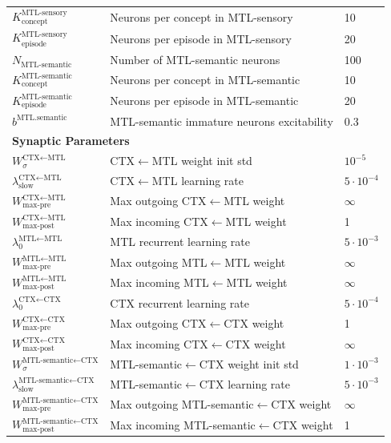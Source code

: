 \documentclass{article}
\begin{document}
\begin{table}[ht]
\begin{tabular}{lp{6cm}l}
$K^\textrm{MTL-sensory}_\textrm{concept}$ & Neurons per concept in MTL-sensory & 10 \\
$K^\textrm{MTL-sensory}_\textrm{episode}$ & Neurons per episode in MTL-sensory & 20 \\
$N_{\text{MTL-semantic}}$ & Number of MTL-semantic neurons & 100 \\
$K^\textrm{MTL-semantic}_\textrm{concept}$ & Neurons per concept in MTL-semantic & 10 \\
$K^\textrm{MTL-semantic}_\textrm{episode}$ & Neurons per episode in MTL-semantic & 20 \\
$b^\text{MTL.semantic}$ & MTL-semantic immature neurons excitability & 0.3 \\
\midrule
\multicolumn{3}{l}{\textbf{Synaptic Parameters}} \\
\midrule
$W_\sigma^{\text{CTX}\leftarrow\text{MTL}}$ & CTX$\leftarrow$MTL weight init std &$10^{-5}$ \\
$\lambda^{\text{CTX}\leftarrow\text{MTL}}_{\textrm{slow}}$ & CTX$\leftarrow$MTL learning rate & $5\cdot 10^{-4}$ \\
$W^{\text{CTX}\leftarrow\text{MTL}}_{\text{max-pre}}$ & Max outgoing CTX$\leftarrow$MTL weight & $\infty$ \\
$W^{\text{CTX}\leftarrow\text{MTL}}_{\text{max-post}}$ & Max incoming CTX$\leftarrow$MTL weight & 1 \\
$\lambda^{\text{MTL}\leftarrow\text{MTL}}_0$ & MTL recurrent learning rate & $5\cdot 10^{-3}$ \\
$W^{\text{MTL}\leftarrow\text{MTL}}_{\text{max-pre}}$ & Max outgoing MTL$\leftarrow$MTL weight & $\infty$ \\
$W^{\text{MTL}\leftarrow\text{MTL}}_{\text{max-post}}$ & Max incoming MTL$\leftarrow$MTL weight & $\infty$ \\
$\lambda^{\text{CTX}\leftarrow\text{CTX}}_0$ & CTX recurrent learning rate & $5\cdot 10^{-4}$ \\
$W^{\text{CTX}\leftarrow\text{CTX}}_{\text{max-pre}}$ & Max outgoing CTX$\leftarrow$CTX weight & 1 \\
$W^{\text{CTX}\leftarrow\text{CTX}}_{\text{max-post}}$ & Max incoming CTX$\leftarrow$CTX weight & $\infty$ \\
$W_\sigma^{\text{MTL-semantic}\leftarrow\text{CTX}}$ & MTL-semantic$\leftarrow$CTX weight init std & $1\cdot 10^{-3}$ \\
$\lambda^{\text{MTL-semantic}\leftarrow\text{CTX}}_{\textrm{slow}}$ & MTL-semantic$\leftarrow$CTX learning rate & $5\cdot 10^{-3}$ \\
$W^{\text{MTL-semantic}\leftarrow\text{CTX}}_{\text{max-pre}}$ & Max outgoing MTL-semantic$\leftarrow$CTX weight & $\infty$ \\
$W^{\text{MTL-semantic}\leftarrow\text{CTX}}_{\text{max-post}}$ & Max incoming MTL-semantic$\leftarrow$CTX weight & 1 \\
\bottomrule
\end{tabular}
\end{table}
\end{document}
